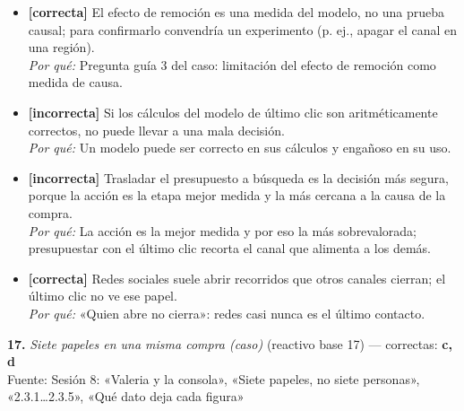 \documentclass[10pt,letterpaper]{article}
\begin{document}
\begin{itemize}[leftmargin=1.2em,itemsep=0pt,topsep=1pt,parsep=0pt]
\item[\textbf{a)}] {\footnotesize \textbf{[correcta]} El efecto de remoción es una medida del modelo, no una prueba causal; para confirmarlo convendría un experimento (p. ej., apagar el canal en una región).\\ \textit{Por qué:} Pregunta guía 3 del caso: limitación del efecto de remoción como medida de causa.}
\item[\textbf{b)}] {\footnotesize \textbf{[incorrecta]} Si los cálculos del modelo de último clic son aritméticamente correctos, no puede llevar a una mala decisión.\\ \textit{Por qué:} Un modelo puede ser correcto en sus cálculos y engañoso en su uso.}
\item[\textbf{c)}] {\footnotesize \textbf{[incorrecta]} Trasladar el presupuesto a búsqueda es la decisión más segura, porque la acción es la etapa mejor medida y la más cercana a la causa de la compra.\\ \textit{Por qué:} La acción es la mejor medida y por eso la más sobrevalorada; presupuestar con el último clic recorta el canal que alimenta a los demás.}
\item[\textbf{d)}] {\footnotesize \textbf{[correcta]} Redes sociales suele abrir recorridos que otros canales cierran; el último clic no ve ese papel.\\ \textit{Por qué:} «Quien abre no cierra»: redes casi nunca es el último contacto.}
\end{itemize}
\vspace{3pt}\noindent\textbf{17.} \textit{Siete papeles en una misma compra (caso)} (reactivo base 17) — correctas: \textbf{c, d}\\[-1pt]
{\scriptsize Fuente: Sesión 8: «Valeria y la consola», «Siete papeles, no siete personas», «2.3.1…2.3.5», «Qué dato deja cada figura»}
\end{document}
